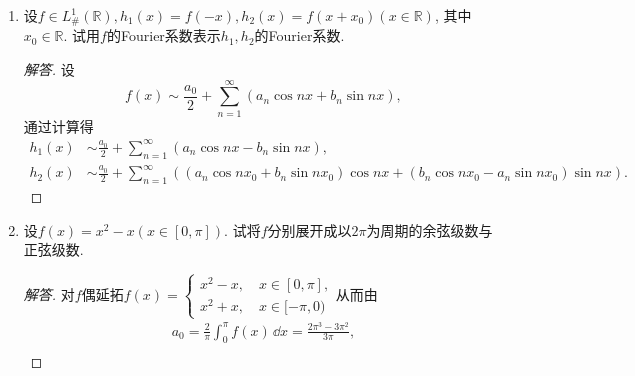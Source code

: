 \begin{quiza}
\begin{enumerate}
\begin{proof}
我们不妨记\(f\)的Fourier级数展开为\(\frac{a_0}{2}+\sum_{n=1}^{\infty}\left(a_n\cos nx+b_n\sin nx\right)\), 并且
\[a_n=\frac{1}{\pi}\int_{0}^{2\pi}f(x)\cos nx\,\dd x,\quad b_n=\frac{1}{\pi}\int_{0}^{2\pi}f(x)\sin nx\,\dd x,\]
注意\(f\)的Fourier级数可以表示为\(\sum_{n=-\infty}^{+\infty}c_n\ee^{\ii nx}\), 其中
\[c_0=\frac{a_0}{2},\quad c_n=\frac{a_n-b_n\ii}{2},\quad c_{-n}=\frac{a_n+b_n\ii}{2},\quad n\geqslant 1,\]
于是有\(c_n=\frac{1}{2\pi}\int_{0}^{2\pi}f(x)\ee^{-\ii nx}\dd x\), 
我们以此为基础, 分析\(h\)的Fourier系数与\(f,g\)的Fourier系数的关系, 
分别记\(g,h\)的Fourier展开为\(\sum_{n=-\infty}^{+\infty}p_n\ee^{\ii nx},\,\sum_{n=-\infty}^{+\infty}q_n\ee^{\ii nx}\), 于是
\[\begin{split}
q_n&=\frac{1}{2\pi}\int_{0}^{2\pi}h(x)\ee^{-\ii nx}\dd x
=\frac{1}{2\pi}\int_{0}^{2\pi}\left(\int_{0}^{2\pi}f(y)g(x-y)\,\dd y\right)\ee^{-\ii nx}\dd x\\
&=\frac{1}{2\pi}\int_{0}^{\pi}f(y)\ee^{-\ii ny}\left(\int_{0}^{2\pi}g(x-y)\ee^{-\ii n(x-y)}\dd x\right)\dd y\\
&=\frac{1}{2\pi}\int_{0}^{2\pi}f(y)\ee^{-\ii ny}\dd y\cdot\int_{0}^{2\pi}g(x)\ee^{-\ii nx}\dd x
=c_n\cdot 2\pi p_n.
\end{split}\]
\end{proof}
\item 设\(f\in L_{\#}^1(\mathbb{R}),h_1(x)=f(-x),h_2(x)=f(x+x_0)\left(x\in\mathbb{R}\right)\), 其中\(x_0\in\mathbb{R}\). 试用\(f\)的Fourier系数表示\(h_1,h_2\)的Fourier系数.
\begin{proof}[解答]
设\[f(x)\sim\frac{a_0}{2}+\sum_{n=1}^{\infty}\left(a_n\cos nx+b_n\sin nx\right),\]
通过计算得\[\begin{split}
h_1(x)&\sim\frac{a_0}{2}+\sum_{n=1}^{\infty}\left(a_n\cos nx-b_n\sin nx\right),\\
h_2(x)&\sim\frac{a_0}{2}+\sum_{n=1}^{\infty}\left(\left(a_n\cos nx_0+b_n\sin nx_0\right)\cos nx+\left(b_n\cos nx_0-a_n\sin nx_0\right)\sin nx\right).
\end{split}\]
\end{proof}
\item 设\(f(x)=x^2-x\left(x\in\left[0,\pi\right]\right)\). 
试将\(f\)分别展开成以\(2\pi\)为周期的余弦级数与正弦级数.
\begin{proof}[解答]
对\(f\)偶延拓\(f(x)=\begin{cases}
x^2-x,\quad x\in[0,\pi],\\
x^2+x,\quad x\in[-\pi,0)
\end{cases}\)从而由
\begin{gather*}
a_0=\frac{2}{\pi}\int_{0}^{\pi}f(x)\,\dd x=\frac{2\pi^3-3\pi^2}{3\pi},\\

\end{gather*}
\end{proof}
\end{enumerate}
\end{quiza}
